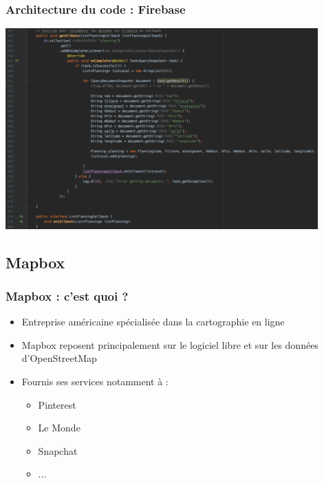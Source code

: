 \documentclass{beamer}
\begin{document}
  \begin{frame}
    \frametitle{Architecture du code : Firebase}

    \begin{center}
      \includegraphics[width=120mm, scale=0.5]{getAllData-firebase.png}
    \end{center}

  \end{frame}




\subsection{Mapbox}
  \begin{frame}
    \frametitle{Mapbox : c'est quoi ?}

    \begin{itemize}
      \item Entreprise américaine spécialisée dans la cartographie en ligne
      \item Mapbox reposent principalement sur le logiciel libre et sur les données d'OpenStreetMap
      \item Fournis ses services notamment à :
      \begin{itemize}
        \item Pinterest
        \item Le Monde
        \item Snapchat
        \item ...
      \end{itemize}
    \end{itemize}

  \end{frame}
\end{document}
